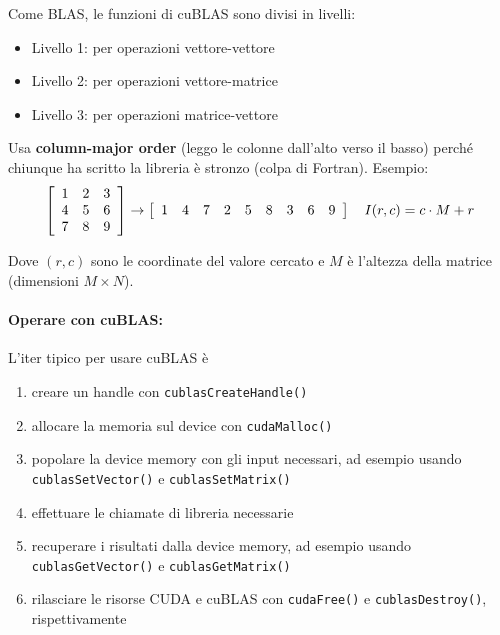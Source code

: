 Come BLAS, le funzioni di cuBLAS sono divisi in livelli: 
\begin{itemize}
	\item Livello 1: per operazioni vettore-vettore
	
	\item Livello 2: per operazioni vettore-matrice
	
	\item Livello 3: per operazioni matrice-vettore
\end{itemize}

Usa \textbf{column-major order} (leggo le colonne dall'alto verso il basso) perché chiunque ha scritto la libreria è stronzo (colpa di Fortran). Esempio: 
$$
\left[
\begin{array}{c c c}
	1 & 2 & 3 \\
	4 & 5 & 6 \\
	7 & 8 & 9
\end{array}
\right]
\rightarrow \left[\begin{array}{c c c c c c c c c}
	1 & 4 & 7 & 2 & 5 & 8 & 3 & 6  & 9
\end{array}\right]
\quad I(r,c) = c \cdot M  + r 
$$

Dove $(r,c)$ sono le coordinate del valore cercato e $M$ è l'altezza della matrice (dimensioni $M \times N$).

\paragraph{Operare con cuBLAS:} L'iter tipico per usare cuBLAS è
\begin{enumerate}
	\item creare un handle con \texttt{cublasCreateHandle()}
	
	\item allocare la memoria sul device con \texttt{cudaMalloc()}
	
	\item popolare la device memory con gli input necessari, ad esempio usando \texttt{cublasSetVector()} e \texttt{cublasSetMatrix()}
	
	\item effettuare le chiamate di libreria necessarie
	
	\item recuperare i risultati dalla device memory, ad esempio usando \texttt{cublasGetVector()} e \texttt{cublasGetMatrix()}
	
	\item rilasciare le risorse CUDA e cuBLAS con \texttt{cudaFree()} e \texttt{cublasDestroy()}, rispettivamente
\end{enumerate}

